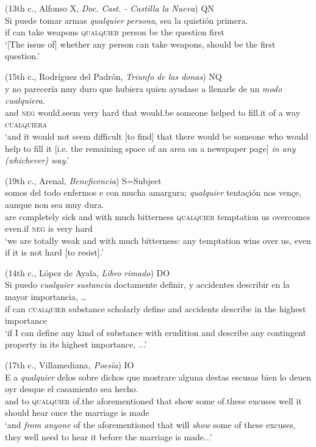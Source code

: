     (13{th} c., Alfonso X, \textit{Doc. Cast. - Castilla la Nueva})
\ex QN\\
    \gll Si puede tomar armas \textit{qualquier} \textit{persona}, sea la quistión primera.\\
if can take weapons \textsc{qualquier} person be the question first\\
    \glt ‘[The issue of] whether any person can take weapons, should be the first question.’

    (15{th} c., Rodríguez del Padrón, \textit{Triunfo de las donas})
\newpage
\ex NQ\\
   \gll y no parecería muy duro que hubiera quien ayudase a llenarle de un \textit{modo} \textit{cualquiera}.\\
and \textsc{neg} would.seem very hard that would.be someone helped to fill.it of a way \textsc{cualquiera}\\
    \glt ‘and it would not seem difficult [to find] that there would be someone who would help to fill it [i.e. the remaining space of an area on a newspaper page] \textit{in any (whichever) way}.’

    (19{th} c., Arenal, \textit{Beneficencia})
\newpage
\ex S=Subject\\
    \gll somos {del todo} enfermos e con mucha amargura; \textit{qualquier} {tentaçión} nos vençe, aunque non sea muy dura.\\
are completely sick and with much bitterness \textsc{qualquier} temptation us overcomes even.if \textsc{neg} is very hard\\
    \glt ‘we are totally weak and with much bitterness: any temptation wins over us, even if it is not hard [to resist].’

    (14{th} c., López de Ayala, \textit{Libro rimado})
\ex DO\\
    \gll Si puedo \textit{cualquier} \textit{sustancia} doctamente definir, y accidentes describir en la mayor importancia, …\\
if can \textsc{cualquier} substance scholarly define and accidents describe in the highest importance\\ 
    \glt ‘if I can define any kind of substance with erudition and describe any contingent property in its highest importance, ...’

    (17{th} c., Villamediana\textit{, Poesía})
\ex IO\\
    \gll [...] E a \textit{qualquier} delos {sobre dichos} que mostrare alguna destas escusas bien lo deuen oyr desque el casamiento sea hecho.\\
 {} and to \textsc{qualquier} of.the aforementioned that show some of.these excuses well it should hear once the marriage is made\\
    \glt ‘and \textit{from anyone} of the aforementioned that will \textit{show} some of these excuses, they well need to hear it before the marriage is made...’

